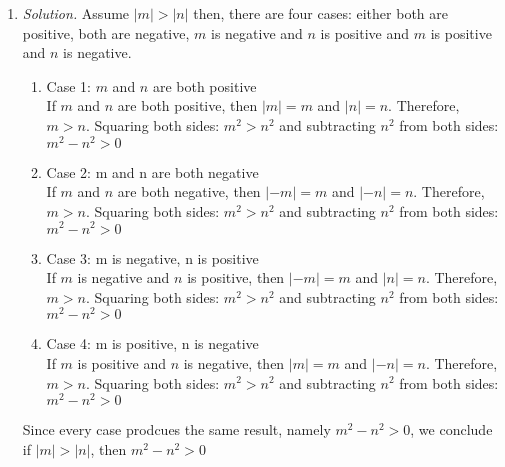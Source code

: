 \documentclass{article}
\begin{document}
\begin{enumerate}
        \item \emph{Solution.} 
            Assume $|m| > |n|$ then, there are four cases: either both are positive, both are 
            negative, $m$ is negative and $n$ is positive and $m$ is positive and $n$ is negative. 
            \begin{enumerate}
                \item Case 1: $m$ and $n$ are both positive\\
                    If $m$ and $n$ are both positive, then $|m| = m$ and $|n| = n$. Therefore, $m > n$. 
                    Squaring both sides: $m^2 > n^2$ and subtracting $n^2$ from both sides: $m^2-n^2>0$
                \item Case 2: m and n are both negative\\
                    If $m$ and $n$ are both negative, then $|-m| = m$ and $|-n| = n$. Therefore, $m > n$. 
                    Squaring both sides: $m^2 > n^2$ and subtracting $n^2$ from both sides: $m^2-n^2>0$
                \item Case 3: m is negative, n is positive\\
                    If $m$ is negative and $n$ is positive, then $|-m| = m$ and $|n| = n$. Therefore, $m > n$. 
                    Squaring both sides: $m^2 > n^2$ and subtracting $n^2$ from both sides: $m^2-n^2>0$
                \item Case 4: m is positive, n is negative\\
                    If $m$ is positive and $n$ is negative, then $|m| = m$ and $|-n| = n$. Therefore, $m > n$. 
                    Squaring both sides: $m^2 > n^2$ and subtracting $n^2$ from both sides: $m^2-n^2>0$
            \end{enumerate}     
            Since every case prodcues the same result, namely $m^2 - n^2 > 0$, we conclude if $|m| > |n|$, then 
            $m^2 - n^2 > 0$
            

    \end{enumerate}
\end{document}
